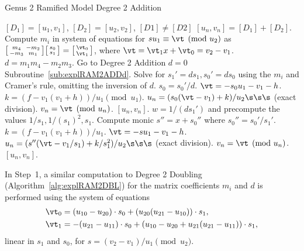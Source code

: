 \begin{algorithm}[htbp]
\caption{Genus 2 Ramified Model Degree 2 Addition\label{alg:explRAM2ADD}}
\begin{algorithmic}[1]
\Require $[D_1] = [u_1,v_1]$, $[D_2] = [u_2,v_2]$, $[D1] \not = [D2]$ \smallskip
\Ensure $[u_n,v_n] = [D_1] + [D_2] $.
\algrule
\vspace{-3pt}
\State Compute $m_i$ in system of equations for $su_1\equiv \vt \pmod{u_2}$ as $ \bigl[ \begin{smallmatrix} m_4 & -m_2\\ -m_3 & m_1\end{smallmatrix}\bigr] \bigl[ \begin{smallmatrix} s_0\\ s_1 \end{smallmatrix} \bigr ] = \bigl[ \begin{smallmatrix}\vt_0 \\  \vt_1\end{smallmatrix} \bigr ]$, where $\vt = \vt_1x + \vt_0 = v_2 - v_1$.
\State $d = m_1m_4 - m_2m_3$.
 \hspace{1pt} Go to Degree 2 Addition $d=0$ Subroutine~\ref{sub:explRAM2ADDd}.
\EndIf
\State Solve for $s_1' = ds_1, s_0' = ds_0$ using the $m_i$ and Cramer's rule, omitting the inversion of $d$.
    \State $s_0 = s_0'/d$.
    \State $\vt = -s_0u_1 - v_1 - h$.
    \State $k = (f - v_1(v_1 + h))/u_1 \pmod{u_1}$.
    \State $u_n = (s_0(\vt - v_1) + k)/u_2 \s\s\s$ (exact division).
    \State $v_n = \vt \pmod{u_n}$.
    \State \Return $[u_n,v_n]$.
\EndIf
\State $w = 1/(ds_1')$ and precompute the values $1/s_1, 1/(s_1)^2, s_1$. 
\State Compute monic $s'' = x + s_0''$ where $s_0'' = s_0'/s_1'$.
\State $k = (f - v_1(v_1 + h))/u_1$.
\State $\vt = -su_1 - v_1 - h$.
\State $u_n = (s''(\vt - v_1/s_1) + k/s_1^2)/u_2 \s\s\s$ (exact division).
\State $v_n = \vt \pmod{u_n}$.
\State \Return $[u_n,v_n]$.
\end{algorithmic}
\end{algorithm}


In Step~1, a similar computation to Degree 2 Doubling (Algorithm~\ref{alg:explRAM2DBL}) for
the matrix coefficients $m_i$ and $d$ is performed using the system of equations 
\begin{align*} 
    \vt_0 &= (u_{10} - u_{20}) \cdot s_0 + (u_{20}(u_{21} - u_{10})) \cdot s_1,\\
    \vt_1 &= -(u_{21}- u_{11}) \cdot s_0 + (u_{10} - u_{20} + u_{21}(u_{21}-u_{11})) \cdot s_1,
\end{align*} linear in $s_1$ and $s_0$, for $s = (v_2 - v_1)/u_1 \pmod{u_2}$.

